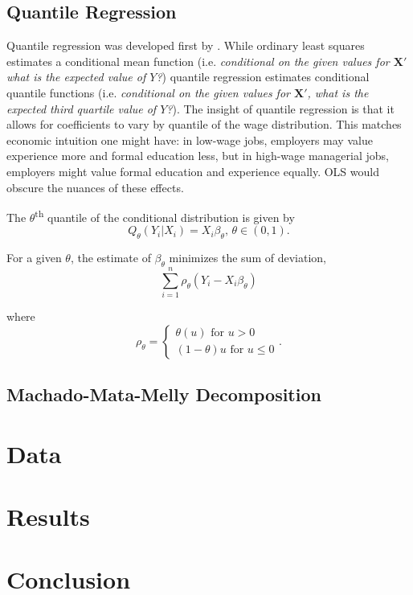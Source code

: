 \documentclass[12pt]{article}
\begin{document}
\subsection{Quantile Regression
\label{subsec:quantile-regression}}
Quantile regression was developed first by \citet{KoenkerandBassett1978}. While ordinary least squares estimates a conditional mean function (i.e.\textit{ conditional on the given values for $\mathbf{X'}$ what is the expected value of $Y$?}) quantile regression estimates conditional quantile functions (i.e.\textit{ conditional on the given values for $\mathbf{X'}$, what is the expected third quartile value of $Y$?}). The insight of quantile regression is that it allows for coefficients to vary by quantile of the wage distribution. This matches economic intuition one might have: in low-wage jobs, employers may value experience more and formal education less, but in high-wage managerial jobs, employers might value formal education and experience equally. OLS would obscure the nuances of these effects.

The $\theta$\textsuperscript{th} quantile of the conditional distribution is given by
\begin{equation}
	Q_{\theta}\left(Y_i|X_i \right) = X_{i}\beta_{\theta}, \, \theta \in (0, 1)
.\end{equation}

For a given $\theta$, the estimate of $\beta_{\theta}$ minimizes the sum of deviation,
\begin{equation}
	\sum_{i=1}^{n} \rho_{\theta} \left( Y_{i} - X_{i} \beta_{\theta} \right) 
\end{equation}

where
\begin{equation}
	\rho_{\theta} = \begin{cases}
		\theta\left(u \right)  \text{ for } u > 0 \\
		\left( 1-\theta \right) u \text{ for } u \leq 0
	\end{cases}
.\end{equation}


\subsection{Machado-Mata-Melly Decomposition
\label{subsec:m-m-m-decomposition}}
\section{Data
\label{sec:data}}

\section{Results
\label{sec:results}}

\section{Conclusion\
\label{sec:conclusion}}

\clearpage
\begin{singlespace}
%
%


\end{singlespace}
\end{document}
